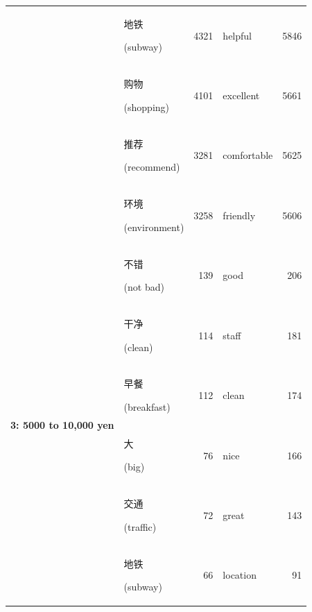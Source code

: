\documentclass[smallextended,natbib]{svjour3}       %
\begin{document}
\begin{table}[ht]
{\begin{tabular}{|c|lr|lr|}
                                                             & \begin{CJK}{UTF8}{gbsn}地铁\end{CJK} (subway)          & 4321  & helpful     & 5846  \\  
                                                             & \begin{CJK}{UTF8}{gbsn}购物\end{CJK} (shopping)        & 4101  & excellent   & 5661  \\  
                                                             & \begin{CJK}{UTF8}{gbsn}推荐\end{CJK} (recommend)       & 3281  & comfortable & 5625  \\  
                                                             & \begin{CJK}{UTF8}{gbsn}环境\end{CJK} (environment)    & 3258  & friendly    & 5606  \\ \hline
        \multirow{10}{*}{\textbf{3: 5000 to 10,000 yen}}     & \begin{CJK}{UTF8}{gbsn}不错\end{CJK} (not bad)         & 139   & good        & 206   \\  
                                                             & \begin{CJK}{UTF8}{gbsn}干净\end{CJK} (clean)           & 114   & staff       & 181   \\  
                                                             & \begin{CJK}{UTF8}{gbsn}早餐\end{CJK} (breakfast)       & 112   & clean       & 174   \\  
                                                             & \begin{CJK}{UTF8}{gbsn}大\end{CJK} (big)              & 76    & nice        & 166   \\  
                                                             & \begin{CJK}{UTF8}{gbsn}交通\end{CJK} (traffic)         & 72    & great       & 143   \\  
                                                             & \begin{CJK}{UTF8}{gbsn}地铁\end{CJK} (subway)          & 66    & location    & 91    \\  

\end{tabular}}
\end{table}
\end{document}
